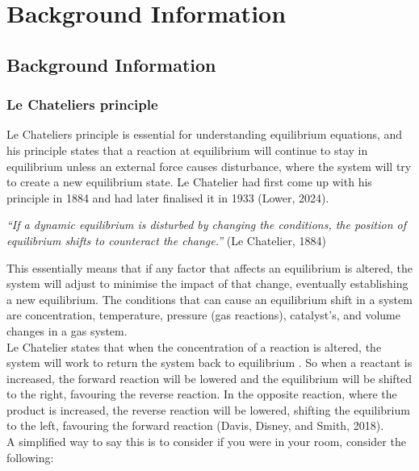 \chapter{Background Information}\label{ch02}

\section{Background Information}

\subsection{Le Chateliers principle}

Le Chateliers principle is essential for understanding equilibrium equations, and his principle states that a reaction at equilibrium will continue to stay in equilibrium unless an external force causes disturbance, where the system will try to create a new equilibrium state. Le Chatelier had first come up with his principle in 1884 and had later finalised it in 1933 (Lower, 2024).

\begin{center}
    \textit{“If a dynamic equilibrium is disturbed by changing the conditions, the position of equilibrium shifts to counteract the change.” } (Le Chatelier, 1884)
\end{center}

This essentially means that if any factor that affects an equilibrium is altered, the system will adjust to minimise the impact of that change, eventually establishing a new equilibrium.
 The conditions that can cause an equilibrium shift in a system are concentration, temperature, pressure (gas reactions), catalyst’s, and volume changes in a gas system. \\

Le Chatelier states that when the concentration of a reaction is altered, the system will work to return the system back to equilibrium	.
So when a reactant is increased, the forward reaction will be lowered and the equilibrium will be shifted to the right, favouring the reverse reaction. In the opposite reaction, where the product is increased, the reverse reaction will be lowered, shifting the equilibrium to the left, favouring the forward reaction (Davis, Disney, and Smith, 2018). \\

A simplified way to say this is to consider if you were in your room, consider the following: 

